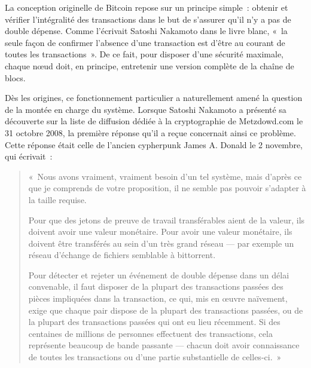 La conception originelle de Bitcoin repose sur un principe simple~: obtenir et vérifier l'intégralité des transactions dans le but de s'assurer qu'il n'y a pas de double dépense. Comme l'écrivait Satoshi Nakamoto dans le livre blanc, «~la seule façon de confirmer l'absence d'une transaction est d'être au courant de toutes les transactions~». De ce fait, pour disposer d'une sécurité maximale, chaque nœud doit, en principe, entretenir une version complète de la chaîne de blocs.

Dès les origines, ce fonctionnement particulier a naturellement amené la question de la montée en charge du système. Lorsque Satoshi Nakamoto a présenté sa découverte sur la liste de diffusion dédiée à la cryptographie de Metzdowd.com le 31 octobre 2008, la première réponse qu'il a reçue concernait ainsi ce problème. Cette réponse était celle de l'ancien cypherpunk James A. Donald le 2 novembre, qui écrivait~:

\begin{quote}
«~Nous avons vraiment, vraiment besoin d'un tel système, mais d'après ce que je comprends de votre proposition, il ne semble pas pouvoir s'adapter à la taille requise.

Pour que des jetons de preuve de travail transférables aient de la valeur, ils doivent avoir une valeur monétaire. Pour avoir une valeur monétaire, ils doivent être transférés au sein d'un très grand réseau --- par exemple un réseau d'échange de fichiers semblable à bittorrent.

Pour détecter et rejeter un événement de double dépense dans un délai convenable, il faut disposer de la plupart des transactions passées des pièces impliquées dans la transaction, ce qui, mis en œuvre naïvement, exige que chaque pair dispose de la plupart des transactions passées, ou de la plupart des transactions passées qui ont eu lieu récemment. Si des centaines de millions de personnes effectuent des transactions, cela représente beaucoup de bande passante --- chacun doit avoir connaissance de toutes les transactions ou d'une partie substantielle de celles-ci.~»
\end{quote} %
%
%

